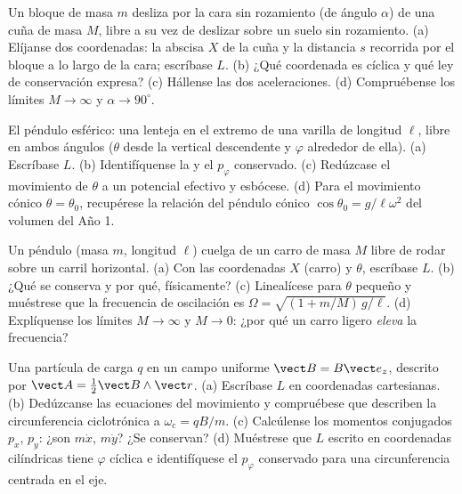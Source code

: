 \begin{exercise}[$\star\star$]\label{exo:b3:lagrangian-mechanics:5}
Un bloque de masa $m$ desliza por la cara sin rozamiento (de ángulo
$\alpha$) de una cuña de masa $M$, libre a su vez de deslizar sobre un suelo
sin rozamiento. (a) Elíjanse dos coordenadas: la abscisa $X$ de la cuña y la
distancia $s$ recorrida por el bloque a lo largo de la cara; escríbase $L$.
(b) ¿Qué coordenada es cíclica y qué ley de conservación expresa? (c) Hállense
las dos aceleraciones. (d) Compruébense los límites $M \to \infty$ y $\alpha \to
90^\circ$.
\end{exercise}

\begin{exercise}[$\star\star$]\label{exo:b3:lagrangian-mechanics:6}
El péndulo esférico: una lenteja en el extremo de una varilla de longitud
$\ell$, libre en ambos ángulos ($\theta$ desde la vertical descendente y
$\varphi$ alrededor de ella). (a) Escríbase $L$. (b) Identifíquense la  y el $p_\varphi$ conservado. (c) Redúzcase el movimiento de $\theta$ a
un potencial efectivo y esbócese. (d) Para el movimiento cónico $\theta =
\theta_0$, recupérese la relación del péndulo cónico $\cos\theta_0 =
g/\ell\omega^2$ del volumen del Año 1.
\end{exercise}

\begin{exercise}[$\star\star$]\label{exo:b3:lagrangian-mechanics:7}
Un péndulo (masa $m$, longitud $\ell$) cuelga de un carro de masa $M$ libre
de rodar sobre un carril horizontal. (a) Con las coordenadas $X$ (carro) y
$\theta$, escríbase $L$. (b) ¿Qué se conserva y por qué, físicamente?
(c) Linealícese para $\theta$ pequeño y muéstrese que la frecuencia de
oscilación es $\Omega = \sqrt{(1 + m/M)\,g/\ell}$. (d) Explíquense los límites
$M \to
\infty$ y $M \to 0$: ¿por qué un carro ligero \emph{eleva} la frecuencia?
\end{exercise}

\begin{exercise}[$\star\star$]\label{exo:b3:lagrangian-mechanics:8}
Una partícula de carga $q$ en un campo uniforme $\vect B = B\vect e_z$,
descrito por $\vect A = \tfrac12\vect B\wedge\vect r$. (a) Escríbase $L$ en
coordenadas cartesianas. (b) Dedúzcanse las ecuaciones del movimiento y
compruébese que describen la circunferencia ciclotrónica a
$\omega_{\text{c}} = qB/m$. (c) Calcúlense los momentos conjugados $p_x$,
$p_y$: ¿son $m\dot x$, $m\dot y$? ¿Se conservan? (d) Muéstrese que $L$
escrito en coordenadas cilíndricas tiene $\varphi$ cíclica e identifíquese el
$p_\varphi$ conservado para una circunferencia centrada en el eje.
\end{exercise}

